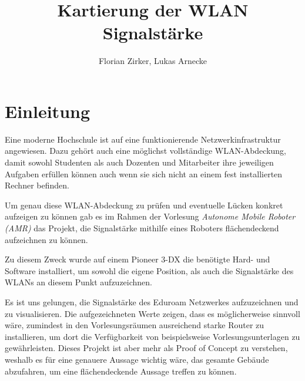 \documentclass{scrartcl}%
\begin{document}
\titlehead{AMR}%
\subject{Projektbericht AMR}%
\title{Kartierung der WLAN Signalstärke}%
\author{Florian Zirker, Lukas Arnecke}%
\publishers{Prof. Dr. Thomas Ihme}%
\maketitle%
\tableofcontents

\section{Einleitung}
Eine moderne Hochschule ist auf eine funktionierende Netzwerkinfrastruktur angewiesen. Dazu gehört auch eine möglichst vollständige WLAN-Abdeckung, damit sowohl Studenten als auch Dozenten und Mitarbeiter ihre jeweiligen Aufgaben erfüllen können auch wenn sie sich nicht an einem fest installierten Rechner befinden.

Um genau diese WLAN-Abdeckung zu prüfen und eventuelle Lücken konkret aufzeigen zu können gab es im Rahmen der Vorlesung \textit{Autonome Mobile Roboter (AMR)} das Projekt, die Signalstärke mithilfe eines Roboters flächendeckend aufzeichnen zu können.

Zu diesem Zweck wurde auf einem Pioneer 3-DX die benötigte Hard- und Software installiert, um sowohl die eigene Position, als auch die Signalstärke des WLANs an diesem Punkt aufzuzeichnen.

Es ist uns gelungen, die Signalstärke des Eduroam Netzwerkes aufzuzeichnen und zu visualisieren. Die aufgezeichneten Werte zeigen, dass es möglicherweise sinnvoll wäre, zumindest in den Vorlesungsräumen ausreichend starke Router zu installieren, um dort die Verfügbarkeit von beispielsweise Vorlesungsunterlagen zu gewährleisten. Dieses Projekt ist aber mehr als Proof of Concept zu verstehen, weshalb es für eine genauere Aussage wichtig wäre, das gesamte Gebäude abzufahren, um eine flächendeckende Aussage treffen zu können.
\end{document}
